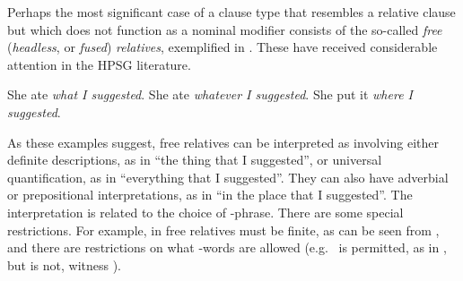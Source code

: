 \documentclass[output=paper
 	        ,biblatex
                ,babelshorthands
                ,newtxmath
                ,draftmode
                ,colorlinks, citecolor=brown
]{langscibook}
\begin{document}
Perhaps the most significant case of a clause type that resembles a relative clause but
which does not function as a nominal modifier consists of the so-called \emph{free}
(\emph{headless}, or \emph{fused}) \emph{relatives}, exemplified in . These
have received considerable attention in the HPSG literature.
\begin{exe}\ex\begin{xlist}\label{x:rc-137}
    \ex\label{x:rc-138} She ate \emph{what I suggested}.
    \ex\label{x:rc-139} She ate \emph{whatever I suggested}.
    \ex\label{x:rc-140} She put it \emph{where I suggested}.
\end{xlist}\end{exe}
As these examples suggest, free relatives can be interpreted as involving either definite
descriptions, as in  ``the thing that I suggested'', or universal
quantification, as in  ``everything that I suggested''. They can also have
adverbial or prepositional interpretations, as in  ``in the place that I
suggested''. The interpretation is related to the choice of -phrase.   There are some special
restrictions.  For example, in  free relatives must be finite, as can be seen
from , and there are restrictions on what -words are allowed (e.g.\
 is permitted, as in , but  is not, witness ).
\begin{exe}\ex\begin{xlist}\label{x:rc-141}
\end{xlist}\end{exe}
\end{document}
